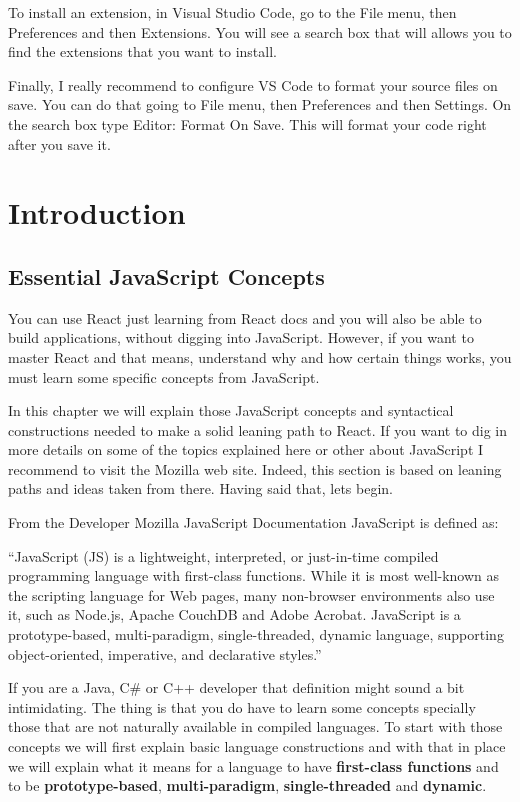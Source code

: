 \documentclass[a4paper, oneside, titlepage, 12pt]{book}
\begin{document}
To install an extension, in Visual Studio Code, go to the File menu, then Preferences and then Extensions. You will see a search box that will allows you to find the extensions that you want to install. 

Finally, I really recommend to configure VS Code to format your source files on save. You can do that going to File menu, then Preferences and then Settings. On the search box type Editor: Format On Save. This will format your code right after you save it.

\part{Introduction}
		
\chapter{Essential JavaScript Concepts}

You can use React just learning from React docs and you will also be able to build applications, without digging into JavaScript. However, if you want to master React and that means, understand why and how certain things works, you must learn some specific concepts from JavaScript.

In this chapter we will explain those JavaScript concepts and syntactical constructions needed to make a solid leaning path to React. If you want to dig in more details on some of the topics explained here or other about JavaScript I recommend to visit the Mozilla\cite{mozilla} web site. Indeed, this section is based on leaning paths and ideas taken from there. Having said that, lets begin.

From the Developer Mozilla JavaScript Documentation \cite{mozilla} JavaScript is defined as:

``JavaScript (JS) is a lightweight, interpreted, or just-in-time compiled programming language with first-class functions. While it is most well-known as the scripting language for Web pages, many non-browser environments also use it, such as Node.js, Apache CouchDB and Adobe Acrobat. JavaScript is a prototype-based, multi-paradigm, single-threaded, dynamic language, supporting object-oriented, imperative, and declarative styles.''
\newline

If you are a Java, C\# or C++ developer that definition might sound a bit intimidating. The thing is that you do have to learn some concepts specially those that are not naturally available in compiled languages. To start with those concepts we will first explain basic language constructions and with that in place we will explain what it means for a language to have \textbf{first-class functions} and to be \textbf{prototype-based}, \textbf{multi-paradigm}, \textbf{single-threaded} and \textbf{dynamic}.
\newline
\end{document}
